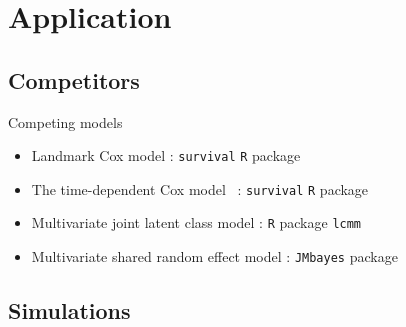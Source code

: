 \documentclass{beamer}
\begin{document}
\section{Application}

\subsection{Competitors}

\begin{frame}{Competing models}

\begin{itemize}
 \item<1-> Landmark Cox model : \texttt{survival} \texttt{R} package~\citep{zhang2018time}
 \item<2-> The time-dependent Cox model~\citep{sueyoshi1992semiparametric} : \texttt{survival} \texttt{R} package
 \item<3-> Multivariate joint latent class model : \texttt{R} package \texttt{lcmm}~\citep{2017_lcmm}
 \item<4-> Multivariate shared random effect model : \texttt{JMbayes} package~\citep{2017_JMbayes}
\end{itemize}

\end{frame}

\subsection{Simulations}
\end{document}
